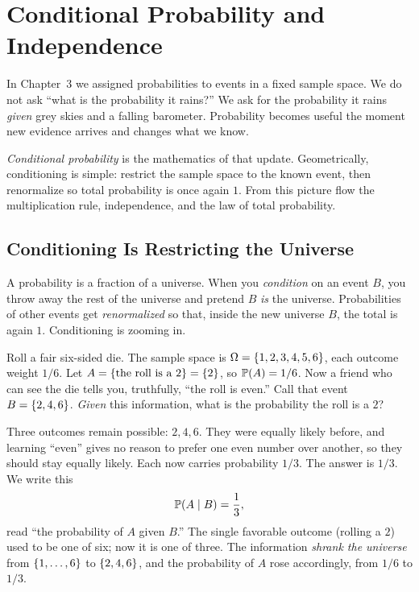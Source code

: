 \chapter{Conditional Probability and Independence}

In Chapter~3 we assigned probabilities to events in a fixed sample space. We do not ask ``what is the probability it rains?'' We ask for the probability it rains \emph{given} grey skies and a falling barometer. Probability becomes useful the moment new evidence arrives and changes what we know.

\emph{Conditional probability} is the mathematics of that update. Geometrically, conditioning is simple: restrict the sample space to the known event, then renormalize so total probability is once again $1$. From this picture flow the multiplication rule, independence, and the law of total probability. 

\section{Conditioning Is Restricting the Universe}
\label{ch04:restricting}

\begin{intuitionbox}
A probability is a fraction of a universe. When you \emph{condition} on an event $B$, you throw away the rest of the universe and pretend $B$ \emph{is} the universe. Probabilities of other events get \emph{renormalized} so that, inside the new universe $B$, the total is again $1$. Conditioning is zooming in.
\end{intuitionbox}

Roll a fair six-sided die. The sample space is $\Omega = \set{1,2,3,4,5,6}$, each outcome weight $1/6$. Let $A = \set{\text{the roll is a } 2} = \set{2}$, so $\P(A) = 1/6$. Now a friend who can see the die tells you, truthfully, ``the roll is even.'' Call that event $B = \set{2,4,6}$. \emph{Given} this information, what is the probability the roll is a $2$?

Three outcomes remain possible: $2, 4, 6$. They were equally likely before, and learning ``even'' gives no reason to prefer one even number over another, so they should stay equally likely. Each now carries probability $1/3$. The answer is $1/3$. We write this
\[
\P(A \given B) = \frac{1}{3},
\]
read ``the probability of $A$ given $B$.'' The single favorable outcome (rolling a $2$) used to be one of six; now it is one of three. The information \emph{shrank the universe} from $\set{1,\dots,6}$ to $\set{2,4,6}$, and the probability of $A$ rose accordingly, from $1/6$ to $1/3$.

